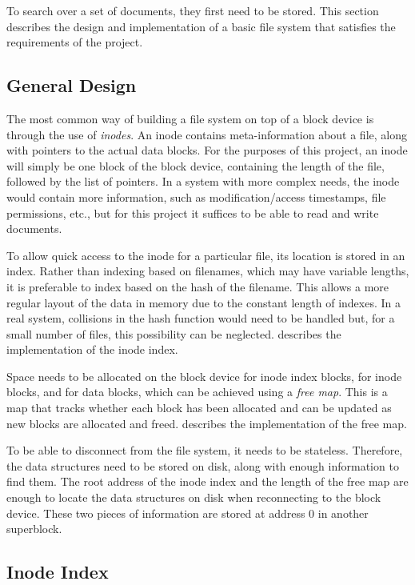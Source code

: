 \documentclass[12pt,a4paper,twoside,openright]{report}
\begin{document}
To search over a set of documents, they first need to be stored. This section describes the design and implementation of a basic file system that satisfies the requirements of the project.

\subsection{General Design}
The most common way of building a file system on top of a block device is through the use of \emph{inodes}. An inode contains meta-information about a file, along with pointers to the actual data blocks. For the purposes of this project, an inode will simply be one block of the block device, containing the length of the file, followed by the list of pointers. In a system with more complex needs, the inode would contain more information, such as modification/access timestamps, file permissions, etc., but for this project it suffices to be able to read and write documents.

To allow quick access to the inode for a particular file, its location is stored in an index. Rather than indexing based on filenames, which may have variable lengths, it is preferable to index based on the hash of the filename. This allows a more regular layout of the data in memory due to the constant length of indexes. In a real system, collisions in the hash function would need to be handled but, for a small number of files, this possibility can be neglected.  describes the implementation of the inode index.

Space needs to be allocated on the block device for inode index blocks, for inode blocks, and for data blocks, which can be achieved using a \emph{free map}. This is a map that tracks whether each block has been allocated and can be updated as new blocks are allocated and freed.  describes the implementation of the free map.

To be able to disconnect from the file system, it needs to be stateless. Therefore, the data structures need to be stored on disk, along with enough information to find them. The root address of the inode index and the length of the free map are enough to locate the data structures on disk when reconnecting to the block device. These two pieces of information are stored at address 0 in another superblock.

\subsection{Inode Index}
\label{subsec:inodeindex}
\end{document}
